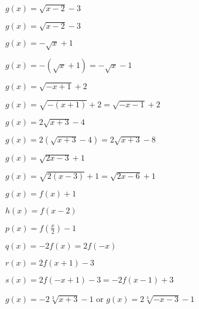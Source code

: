 \begin{shortexenum}[MMMMMMM]
\item  $g(x) = \sqrt{x-2} - 3$
\item  $g(x) = \sqrt{x-2} - 3$
\item  $g(x) = -\sqrt{x} + 1$
\item  $g(x) = -(\sqrt{x} + 1) = -\sqrt{x} - 1$
\item  $g(x) = \sqrt{-x+1} + 2$
\item  $g(x) = \sqrt{-(x+1)} + 2 = \sqrt{-x-1} + 2$
\item  $g(x) = 2\sqrt{x+3} - 4$
\item  $g(x) = 2\left(\sqrt{x+3} - 4\right) = 2\sqrt{x+3} - 8$
\item  $g(x) = \sqrt{2x-3} + 1$
\item  $g(x) = \sqrt{2(x-3)} + 1 = \sqrt{2x-6}+1$
\item  $g(x)=f(x)+1$ 
\item  $h(x) = f(x-2)$ 
\item   $p(x) = f\left( \frac{x}{2} \right) -1$
\item  $q(x) = -2f(x) = 2f(-x)$ 
\item  $r(x) = 2f(x+1)-3$
\item  $s(x) = 2f(-x+1)-3 = -2f(x-1)+3$  
\item $g(x) = -2\sqrt[3]{x + 3} - 1$ or $g(x) = 2\sqrt[3]{-x - 3} - 1$
\end{shortexenum}
